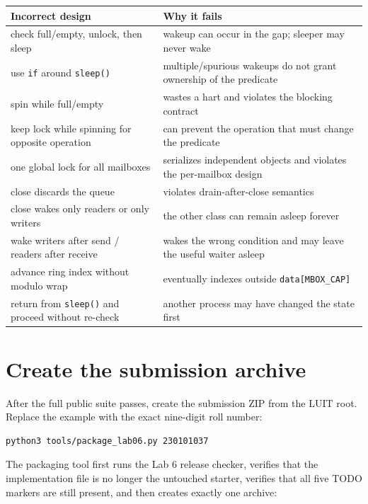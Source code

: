 \documentclass[11pt,a4paper]{article}
\newcommand{\file}[1]{\texttt{#1}}
\begin{document}
\begin{center}
\begin{tabularx}{0.96\textwidth}{@{}p{54mm}X@{}}
\toprule
\textbf{Incorrect design} & \textbf{Why it fails} \\
\midrule
check full/empty, unlock, then sleep & wakeup can occur in the gap; sleeper may never wake \\
use \file{if} around \file{sleep()} & multiple/spurious wakeups do not grant ownership of the predicate \\
spin while full/empty & wastes a hart and violates the blocking contract \\
keep lock while spinning for opposite operation & can prevent the operation that must change the predicate \\
one global lock for all mailboxes & serializes independent objects and violates the per-mailbox design \\
close discards the queue & violates drain-after-close semantics \\
close wakes only readers or only writers & the other class can remain asleep forever \\
wake writers after send / readers after receive & wakes the wrong condition and may leave the useful waiter asleep \\
advance ring index without modulo wrap & eventually indexes outside \file{data[MBOX\_CAP]} \\
return from \file{sleep()} and proceed without re-check & another process may have changed the state first \\
\bottomrule
\end{tabularx}
\end{center}


\section{Create the submission archive}

After the full public suite passes, create the submission ZIP from the LUIT root. Replace the example with the exact nine-digit roll number:

\begin{lstlisting}[language=bash]
python3 tools/package_lab06.py 230101037
\end{lstlisting}

The packaging tool first runs the Lab 6 release checker, verifies that the implementation file is no longer the untouched starter, verifies that all five TODO markers are still present, and then creates exactly one archive:
\end{document}
